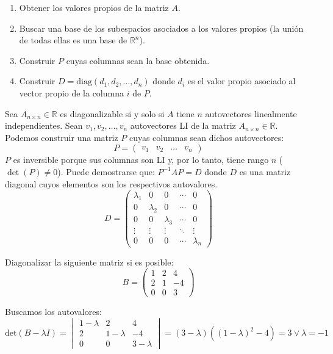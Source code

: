 \begin{}
\begin{enumerate}
    \item Obtener los valores propios de la matriz $A$.
    \item Buscar una base de los subespacios asociados a los valores propios (la unión de todas ellas es una base de $\mathbb{R}^n$).
    \item Construir $P$ cuyas columnas sean la base obtenida.
    \item Construir $D = \text{diag}(d_1, d_2, \dots, d_n)$ donde $d_i$ es el valor propio asociado al vector propio de la columna $i$ de $P$.
\end{enumerate}
Sea \( A_{n \times n} \in \mathbb{R} \) es diagonalizable si y solo si \( A \) tiene \( n \) autovectores linealmente independientes. Sean \( v_1, v_2, \ldots, v_n \) autovectores LI de la matriz \( A_{n \times n} \in \mathbb{R} \). Podemos construir una matriz \( P \) cuyas columnas sean dichos autovectores:
\[ P = \begin{pmatrix} v_1 & v_2 & \ldots & v_n \end{pmatrix} \]
\( P \) es inversible porque sus columnas son LI y, por lo tanto, tiene rango \( n \) (\( \det(P) \neq 0 \)). Puede demostrarse que: \( P^{-1}AP = D \) donde \( D \) es una matriz diagonal cuyos elementos son los respectivos autovalores.
$$
D = \begin{pmatrix}
\lambda_1 & 0 & 0 & \cdots & 0 \\
0 & \lambda_2 & 0 & \cdots & 0 \\
0 & 0 & \lambda_3 & \cdots & 0 \\
\vdots & \vdots & \vdots & \ddots & \vdots \\
0 & 0 & 0 & \cdots & \lambda_n
\end{pmatrix}$$

\begin{example}
 Diagonalizar la siguiente matriz si es posible:
\[ B = \begin{pmatrix}
1 & 2 & 4 \\
2 & 1 & -4 \\
0 & 0 & 3
\end{pmatrix} \]

Buscamos los autovalores:
\[ \text{det}(B - \lambda I) = \begin{vmatrix}
1 - \lambda & 2 & 4 \\
2 & 1 - \lambda & -4 \\
0 & 0 & 3 - \lambda
\end{vmatrix} = (3 - \lambda) ((1 - \lambda)^2 - 4) = 3 \lor \lambda = -1 \]


\end{example}
\end{}
